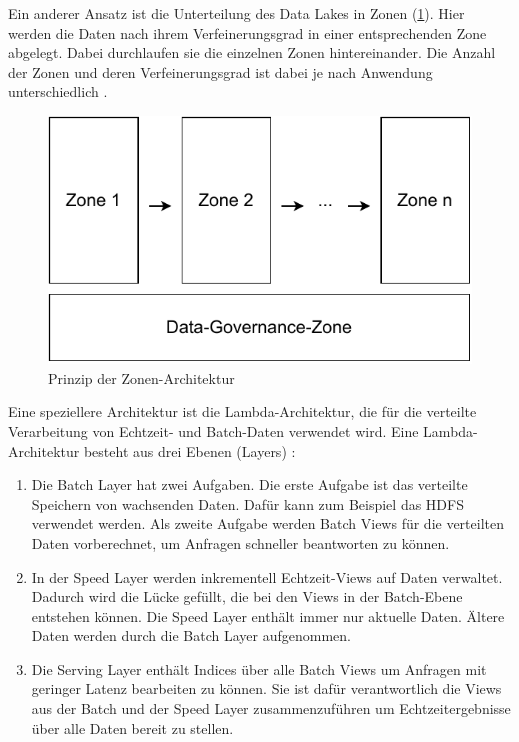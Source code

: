 Ein anderer Ansatz ist die Unterteilung des Data Lakes in Zonen (\cref{fig:datalake-zones}).
Hier werden die Daten nach ihrem Verfeinerungsgrad in einer entsprechenden Zone abgelegt.
Dabei durchlaufen sie die einzelnen Zonen hintereinander.
Die Anzahl der Zonen und deren Verfeinerungsgrad ist dabei je nach Anwendung unterschiedlich \parencite{dl-zones}.

\begin{figure}
    \centering
    \includegraphics[width=.8\textwidth]{Grafiken/Grundlagen-Zones.pdf}
    \caption{Prinzip der Zonen-Architektur}
    \label{fig:datalake-zones}
\end{figure}

Eine speziellere Architektur ist die Lambda-Architektur, die für die verteilte Verarbeitung von Echtzeit- und Batch-Daten verwendet wird.
Eine Lambda-Architektur besteht aus drei Ebenen (Layers) \parencite{lambda-arch}: \begin{enumerate}
    \item Die Batch Layer hat zwei Aufgaben.
    Die erste Aufgabe ist das verteilte Speichern von wachsenden Daten.
    Dafür kann zum Beispiel das HDFS verwendet werden.
    Als zweite Aufgabe werden Batch Views für die verteilten Daten vorberechnet, um Anfragen schneller beantworten zu können.
    \item In der Speed Layer werden inkrementell Echtzeit-Views auf Daten verwaltet.
    Dadurch wird die Lücke gefüllt, die bei den Views in der Batch-Ebene entstehen können.
    Die Speed Layer enthält immer nur aktuelle Daten.
    Ältere Daten werden durch die Batch Layer aufgenommen.
    \item Die Serving Layer enthält Indices über alle Batch Views um Anfragen mit geringer Latenz bearbeiten zu können. Sie ist dafür verantwortlich die Views aus der Batch und der Speed Layer zusammenzuführen um Echtzeitergebnisse über alle Daten bereit zu stellen.
\end{enumerate}

